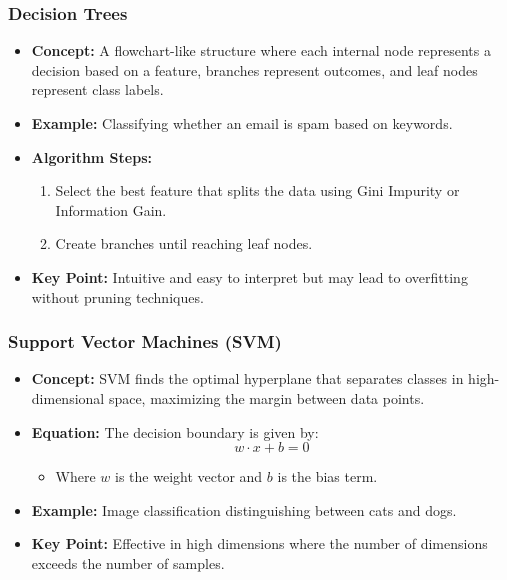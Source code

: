 \documentclass[aspectratio=169]{beamer}
\begin{document}
\begin{frame}[fragile]
    \frametitle{Decision Trees}
    \begin{itemize}
        \item \textbf{Concept:} A flowchart-like structure where each internal node represents a decision based on a feature, branches represent outcomes, and leaf nodes represent class labels.
        \item \textbf{Example:} Classifying whether an email is spam based on keywords.
        \item \textbf{Algorithm Steps:}
        \begin{enumerate}
            \item Select the best feature that splits the data using Gini Impurity or Information Gain.
            \item Create branches until reaching leaf nodes.
        \end{enumerate}
        \item \textbf{Key Point:} Intuitive and easy to interpret but may lead to overfitting without pruning techniques.
    \end{itemize}
\end{frame}

\begin{frame}[fragile]
    \frametitle{Support Vector Machines (SVM)}
    \begin{itemize}
        \item \textbf{Concept:} SVM finds the optimal hyperplane that separates classes in high-dimensional space, maximizing the margin between data points.
        \item \textbf{Equation:} The decision boundary is given by:
        \begin{equation}
            w \cdot x + b = 0
        \end{equation}
        \begin{itemize}
            \item Where $w$ is the weight vector and $b$ is the bias term.
        \end{itemize}
        \item \textbf{Example:} Image classification distinguishing between cats and dogs.
        \item \textbf{Key Point:} Effective in high dimensions where the number of dimensions exceeds the number of samples.
    \end{itemize}
\end{frame}
\end{document}
